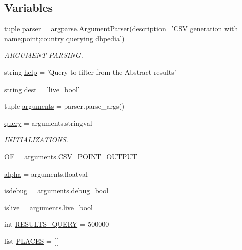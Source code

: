 \subsection*{\-Variables}
\begin{DoxyCompactItemize}
\item 
tuple \hyperlink{namespacevagueplaces_a12260e069d767b0750c1e8f31af9cefb}{parser} = argparse.\-Argument\-Parser(description='\-C\-S\-V generation with name;point;\hyperlink{namespacevagueplaces_a0bc0e84c0011cb9531184b67d05dc0a4}{country} querying dbpedia')
\begin{DoxyCompactList}\small\item\em \-A\-R\-G\-U\-M\-E\-N\-T \-P\-A\-R\-S\-I\-N\-G. \end{DoxyCompactList}\item 
string \hyperlink{namespacevagueplaces_a23c662171941a2348ade72200850b133}{help} = '\-Query to filter from the \-Abstract results'
\item 
string \hyperlink{namespacevagueplaces_aacfed2e477d0a97080d7d50fb875619e}{dest} = 'live\-\_\-bool'
\item 
tuple \hyperlink{namespacevagueplaces_a3f96b3b895dcb14f99c0348f7c35f90a}{arguments} = parser.\-parse\-\_\-args()
\item 
\hyperlink{namespacevagueplaces_afc402b26135ad61137fcb1208053cbf8}{query} = arguments.\-stringval
\begin{DoxyCompactList}\small\item\em \-I\-N\-I\-T\-I\-A\-L\-I\-Z\-A\-T\-I\-O\-N\-S. \end{DoxyCompactList}\item 
\hyperlink{namespacevagueplaces_a206384d666558c145679f9ecdb3dd7c5}{\-O\-F} = arguments.\-C\-S\-V\-\_\-\-P\-O\-I\-N\-T\-\_\-\-O\-U\-T\-P\-U\-T
\item 
\hyperlink{namespacevagueplaces_a968c6f69551718c27a9617d123ac04b0}{alpha} = arguments.\-floatval
\item 
\hyperlink{namespacevagueplaces_a4dcc7b9604e1fd16000c4f36becf8697}{isdebug} = arguments.\-debug\-\_\-bool
\item 
\hyperlink{namespacevagueplaces_ae377bfacd073c19ab35ff25f123eab1a}{islive} = arguments.\-live\-\_\-bool
\item 
int \hyperlink{namespacevagueplaces_a07cd0ae682261d720780294aba9e03f4}{\-R\-E\-S\-U\-L\-T\-S\-\_\-\-Q\-U\-E\-R\-Y} = 500000
\item 
list \hyperlink{namespacevagueplaces_a611b348baa6cc63b93677dea3e188397}{\-P\-L\-A\-C\-E\-S} = \mbox{[}$\,$\mbox{]}

\end{DoxyCompactItemize}
